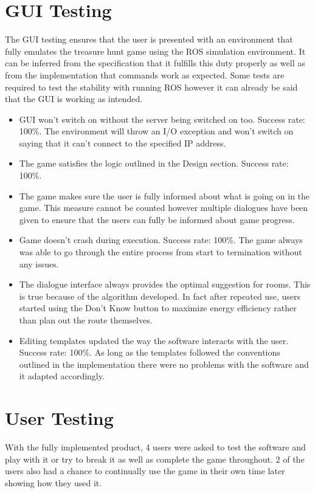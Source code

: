     \section{GUI Testing}
      The GUI testing ensures that the user is presented with an environment that fully emulates the treasure hunt game using the ROS simulation environment. It can be inferred from the specification that it fulfills this duty properly as well as from the implementation that commands work as expected. Some tests are required to test the stability with running ROS however it can already be said that the GUI is working as intended.
      \begin{itemize}
        \item GUI won't switch on without the server being switched on too. Success rate: 100\%. The environment will throw an I/O exception and won't switch on saying that it can't connect to the specified IP address.
        \item The game satisfies the logic outlined in the Design section. Success rate: 100\%.
        \item The game makes sure the user is fully informed about what is going on in the game. This measure cannot be counted however multiple dialogues have been given to ensure that the users can fully be informed about game progress.
        \item Game doesn't crash during execution. Success rate: 100\%. The game always was able to go through the entire process from start to termination without any issues.
        \item The dialogue interface always provides the optimal suggestion for rooms. This is true because of the algorithm developed. In fact after repeated use, users started using the Don't Know button to maximize energy efficiency rather than plan out the route themselves.
        \item Editing templates updated the way the software interacts with the user. Success rate: 100\%. As long as the templates followed the conventions outlined in the implementation there were no problems with the software and it adapted accordingly.
      \end{itemize}

    \section{User Testing}
      With the fully implemented product, 4 users were asked to test the software and play with it or try to break it as well as complete the game throughout. 2 of the users also had a chance to continually use the game in their own time later showing how they used it.

